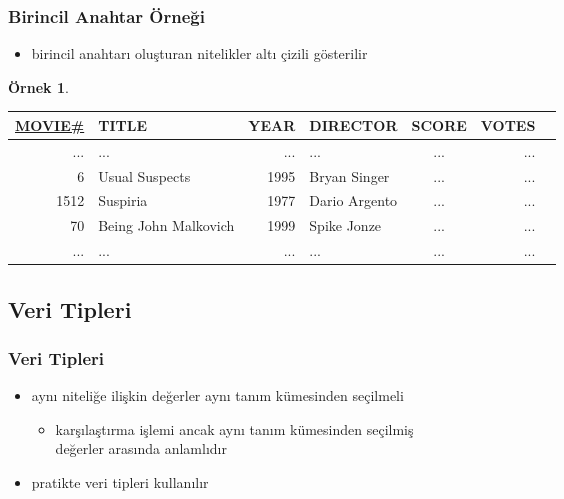 \documentclass[dvipsnames]{beamer}
\theoremstyle{definition}
\theoremstyle{example}
\newtheorem{ornek}[theorem]{Örnek}
\theoremstyle{plain}
\begin{document}
\begin{frame}
  \frametitle{Birincil Anahtar Örneği}

  \begin{itemize}
    \item birincil anahtarı oluşturan nitelikler altı çizili gösterilir
  \end{itemize}

  \begin{ornek}
    \begin{tiny}
    \begin{table}
      \begin{tabular}{|r|l|r|l|c|r|r|}\hline
\underline{MOVIE\#} & TITLE & YEAR & DIRECTOR      & SCORE & VOTES\\[2pt]\hline\hline
 ... & ...                  &  ... & ...           &   ... &   ...\\\hline
   6 & Usual Suspects       & 1995 & Bryan Singer  &   ... &   ...\\\hline
1512 & Suspiria             & 1977 & Dario Argento &   ... &   ...\\\hline
  70 & Being John Malkovich & 1999 & Spike Jonze   &   ... &   ...\\\hline
 ... & ...                  &  ... & ...           &   ... &   ...\\\hline
      \end{tabular}
    \end{table}
    \end{tiny}
  \end{ornek}
\end{frame}

\subsection{Veri Tipleri}

\begin{frame}
  \frametitle{Veri Tipleri}

  \begin{itemize}
    \item aynı niteliğe ilişkin değerler aynı tanım kümesinden seçilmeli
    \begin{itemize}
      \item karşılaştırma işlemi ancak aynı tanım kümesinden seçilmiş\\
        değerler arasında anlamlıdır
    \end{itemize}

    \pause
    \medskip
    \item pratikte veri tipleri kullanılır
  \end{itemize}
\end{frame}
\end{document}
